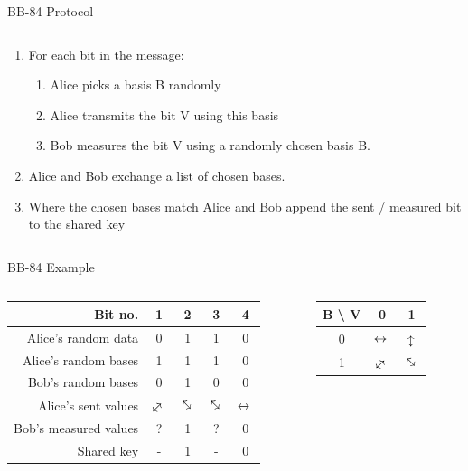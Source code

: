 \documentclass{beamer}
\newcommand{\myarrow}[1][-45]{%
  \mathrel{%
    \text{$
     \begin{tikzpicture}[baseline = -0.5ex]
       \node[inner sep=0pt,outer sep=0pt,rotate = #1] (a) at (0,0)  {$\leftrightarrow{}$};
    \end{tikzpicture}
    $}%
  }%
}%
\begin{document}
	\begin{frame}{BB-84 Protocol} %
		\begin{columns}
			\begin{column}{\textwidth}
				\begin{enumerate}
					\item For each bit in the message:
						\begin{enumerate}
							\item Alice picks a basis B randomly
							\item Alice transmits the bit V using this basis
							\item Bob measures the bit V using a randomly chosen basis B.
						\end{enumerate}
					\item Alice and Bob exchange a list of chosen bases.
					\item Where the chosen bases match Alice and Bob append the sent / measured bit to the shared key
				\end{enumerate}
			\end{column}
		\end{columns}
	\end{frame}
	
	\begin{frame}{BB-84 Example} %
		\begin{columns}
			\begin{column}{0.7\textwidth}
				\begin{table}
					\begin{tabular}{r | c | c | c | c  }
						Bit no. & 1 & 2 & 3 & 4 \\
						\hline
						Alice's random data & 0 & 1 & 1 & 0 \\
						Alice's random bases & 1 & 1 & 1 & 0 \\
						Bob's random bases & 0 & 1 & 0 & 0 \\
						\hline
						Alice's sent values & $\myarrow[45]$ & $\myarrow[-45]$ & $\myarrow[-45]$ & $\myarrow[0]$ \\
						Bob's measured values & ? & 1 & ? & 0 \\
						\hline
						Shared key & - & 1 & - & 0 
					\end{tabular}
				\end{table}
			\end{column}
			\vrule{}
			\begin{column}{0.3\textwidth}
				\begin{table}
					\begin{tabular}{c | c  c}
						 B \textbackslash \; V & 0 & 1 \\
						  \hline
						0 & $\myarrow[0]$ & $\myarrow[90]$ \\
						1 & $\myarrow[45]$ & $\myarrow[-45]$ \\
					\end{tabular}
	
				\end{table}

			\end{column}
		\end{columns}
	\end{frame}
	
\end{document}
